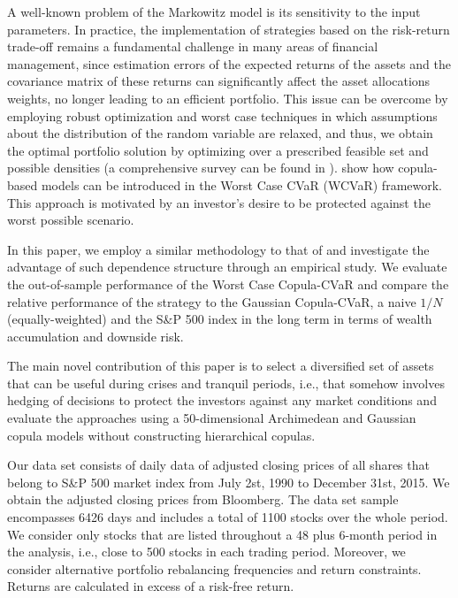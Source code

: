\documentclass[a4paper,10pt]{article}
\begin{document}
A well-known problem of the Markowitz model is its sensitivity to the input parameters. In practice, the implementation of strategies based on the risk-return trade-off remains a fundamental challenge in many areas of financial management, since estimation errors of the expected returns of the assets and the covariance matrix of these returns can significantly affect the asset allocations weights, no longer leading to an efficient portfolio. This issue can be overcome by employing robust optimization and worst case techniques \citep{benati2003,zhu2009worst,polak2010,fertis2012,kakouris14,polak2017} in which assumptions about the distribution of the random variable are relaxed, and thus, we obtain the optimal portfolio solution by optimizing over a prescribed feasible set and possible densities (a comprehensive survey can be found in \citet*{gabrel2014}). \citet*{kakouris14} show how copula-based models can be introduced in the Worst Case CVaR (WCVaR) framework. This approach is motivated by an investor's desire to be protected against the worst possible scenario.

In this paper, we employ a similar methodology to that of \citet*{kakouris14} and investigate the advantage of such dependence structure through an empirical study. We evaluate the out-of-sample performance of the Worst Case Copula-CVaR and compare the relative performance of the strategy to the Gaussian Copula-CVaR, a naive $1/N$ (equally-weighted) and the S\&P 500 index in the long term in terms of wealth accumulation and downside risk.

The main novel contribution of this paper is to select a diversified set of assets that can be useful during crises and tranquil periods, i.e., that somehow involves hedging of decisions to protect the investors against any market conditions and evaluate the approaches using a 50-dimensional Archimedean and Gaussian copula models without constructing hierarchical copulas.  

Our data set consists of daily data of adjusted closing prices of all shares that belong to S\&P 500 market index from July 2st, 1990 to December 31st, 2015. We obtain the adjusted closing prices from Bloomberg. The data set sample encompasses 6426 days and includes a total of 1100 stocks over the whole period. We consider only stocks that are listed throughout a 48 plus 6-month period in the analysis, i.e., close to 500 stocks in each trading period. Moreover, we consider alternative portfolio rebalancing frequencies and return constraints. Returns are calculated in excess of a risk-free return.
\end{document}

